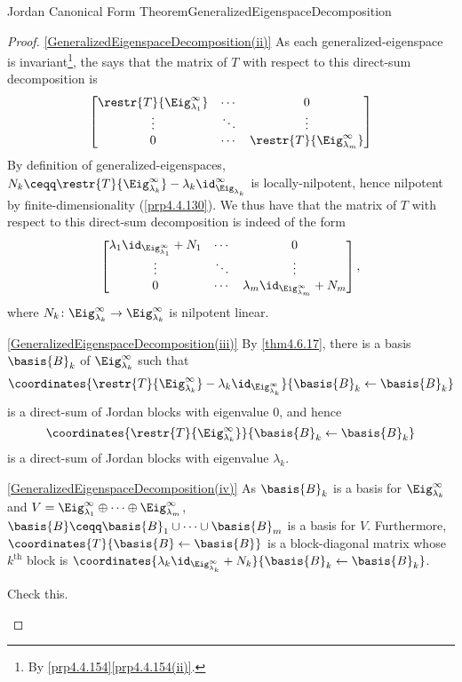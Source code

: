 \begin{thm}{Jordan Canonical Form Theorem}{GeneralizedEigenspaceDecomposition}
\begin{proof}
		\blni
		\cref{GeneralizedEigenspaceDecomposition(ii)} As each generalized-eigenspace is invariant\footnote{By \cref{prp4.4.154}\cref{prp4.4.154(ii)}.}, the  says that the matrix of $T$ with respect to this direct-sum decomposition is
		\begin{equation}
			\begin{bmatrix}\restr{T}{\Eig _{\lambda _1}^{\infty}} & \cdots & 0 \\ \vdots & \ddots & \vdots \\ 0 & \cdots & \restr{T}{\Eig _{\lambda _m}^{\infty}}\end{bmatrix}
		\end{equation}
		By definition of generalized-eigenspaces, $N_k\ceqq \restr{T}{\Eig _{\lambda _k}^{\infty}}-\lambda _k\id _{\Eig _{\lambda _k}}^{\infty}$ is locally-nilpotent, hence nilpotent by finite-dimensionality (\cref{prp4.4.130}).  We thus have that the matrix of $T$ with respect to this direct-sum decomposition is indeed of the form
		\begin{equation}
			\begin{bmatrix}\lambda _1\id _{\Eig _{\lambda _1}^{\infty}}+N_1 & \cdots & 0 \\ \vdots & \ddots & \vdots \\ 0 & \cdots & \lambda _m\id _{\Eig _{\lambda _m}^{\infty}}+N_m\end{bmatrix},
		\end{equation}
		where $N_k\colon \Eig _{\lambda _k}^{\infty}\rightarrow \Eig _{\lambda _k}^{\infty}$ is nilpotent linear.
		
		\blni
		\cref{GeneralizedEigenspaceDecomposition(iii)} By \cref{thm4.6.17}, there is a basis $\basis{B}_k$ of $\Eig _{\lambda _k}^{\infty}$ such that
		\begin{equation}
			\coordinates{\restr{T}{\Eig _{\lambda _k}^{\infty}}-\lambda _k\id _{\Eig _{\lambda _k}^{\infty}}}{\basis{B}_k\leftarrow \basis{B}_k}
		\end{equation}
		is a direct-sum of Jordan blocks with eigenvalue $0$, and hence
		\begin{equation}
			\coordinates{\restr{T}{\Eig _{\lambda _k}^{\infty}}}{\basis{B}_k\leftarrow \basis{B}_k}
		\end{equation}
		is a direct-sum of Jordan blocks with eigenvalue $\lambda _k$.
		
		\blni
		\cref{GeneralizedEigenspaceDecomposition(iv)} As $\basis{B}_k$ is a basis for $\Eig _{\lambda _k}^{\infty}$ and $V=\Eig _{\lambda _1}^{\infty}\oplus \cdots \oplus \Eig _{\lambda _m}^{\infty}$, $\basis{B}\ceqq \basis{B}_1\cup \cdots \cup \basis{B}_m$ is a basis for $V$.  Furthermore, $\coordinates{T}{\basis{B}\leftarrow \basis{B}}$ is a block-diagonal matrix whose $k^{\text{th}}$ block is $\coordinates{\lambda _k\id _{\Eig _{\lambda _k}^{\infty}}+N_k}{\basis{B}_k\leftarrow \basis{B}_k}$.
		\begin{exr}[breakable=false]{}{}
			Check this.
		\end{exr}
		

\end{proof}
\end{thm}
